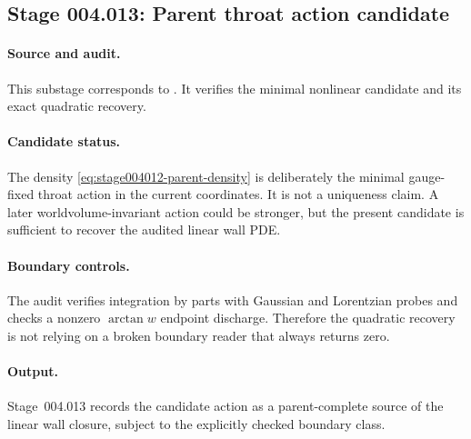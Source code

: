 \subsection*{Stage 004.013: Parent throat action candidate}
\label{subsec:stage004013-parent-throat-action-candidate}

\paragraph{Source and audit.}
This substage corresponds to
.
It verifies the minimal nonlinear candidate and its exact quadratic recovery.

\paragraph{Candidate status.}
The density \eqref{eq:stage004012-parent-density} is deliberately the minimal
gauge-fixed throat action in the current coordinates.  It is not a uniqueness
claim.  A later worldvolume-invariant action could be stronger, but the
present candidate is sufficient to recover the audited linear wall PDE.

\paragraph{Boundary controls.}
The audit verifies integration by parts with Gaussian and Lorentzian probes
and checks a nonzero \(\arctan w\) endpoint discharge.  Therefore the
quadratic recovery is not relying on a broken boundary reader that always
returns zero.

\paragraph{Output.}
Stage~004.013 records the candidate action as a parent-complete source of the
linear wall closure, subject to the explicitly checked boundary class.
